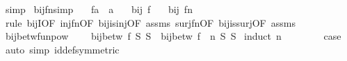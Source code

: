 \begin{isabellebody}
\isamarkupfalse%
\ simp%
\endisatagproof
{\isafoldproof}%
%
\isadelimproof
\isanewline
%
\endisadelimproof
\isanewline
{}\isamarkupfalse%
\ bij{\isacharunderscore}{\kern0pt}fn{\isacharbrackleft}{\kern0pt}simp{\isacharbrackright}{\kern0pt}{\isacharcolon}{\kern0pt}\isanewline
\ \ \ f{\isacharcolon}{\kern0pt}{\isacharcolon}{\kern0pt}{\isachardoublequoteopen}{\isacharprime}{\kern0pt}a\ {\isasymRightarrow}\ {\isacharprime}{\kern0pt}a{\isachardoublequoteclose}\isanewline
\ \ \ {\isachardoublequoteopen}bij\ f{\isachardoublequoteclose}\isanewline
\ \ \ {\isachardoublequoteopen}bij\ {\isacharparenleft}{\kern0pt}f{\isacharcircum}{\kern0pt}{\isacharcircum}{\kern0pt}n{\isacharparenright}{\kern0pt}{\isachardoublequoteclose}\isanewline
%
\isadelimproof
%
\endisadelimproof
%
\isatagproof
{}\isamarkupfalse%
\ {\isacharparenleft}{\kern0pt}rule\ bijI{\isacharbrackleft}{\kern0pt}OF\ inj{\isacharunderscore}{\kern0pt}fn{\isacharbrackleft}{\kern0pt}OF\ bij{\isacharunderscore}{\kern0pt}is{\isacharunderscore}{\kern0pt}inj{\isacharbrackleft}{\kern0pt}OF\ assms{\isacharbrackright}{\kern0pt}{\isacharbrackright}{\kern0pt}\ surj{\isacharunderscore}{\kern0pt}fn{\isacharbrackleft}{\kern0pt}OF\ bij{\isacharunderscore}{\kern0pt}is{\isacharunderscore}{\kern0pt}surj{\isacharbrackleft}{\kern0pt}OF\ assms{\isacharbrackright}{\kern0pt}{\isacharbrackright}{\kern0pt}{\isacharbrackright}{\kern0pt}{\isacharparenright}{\kern0pt}%
\endisatagproof
{\isafoldproof}%
%
\isadelimproof
\isanewline
%
\endisadelimproof
\isanewline
{}\isamarkupfalse%
\ bij{\isacharunderscore}{\kern0pt}betw{\isacharunderscore}{\kern0pt}funpow{\isacharcolon}{\kern0pt}\ \isanewline
\ \ \ {\isachardoublequoteopen}bij{\isacharunderscore}{\kern0pt}betw\ f\ S\ S{\isachardoublequoteclose}\ \ {\isachardoublequoteopen}bij{\isacharunderscore}{\kern0pt}betw\ {\isacharparenleft}{\kern0pt}f\ {\isacharcircum}{\kern0pt}{\isacharcircum}{\kern0pt}\ n{\isacharparenright}{\kern0pt}\ S\ S{\isachardoublequoteclose}\isanewline
%
\isadelimproof
%
\endisadelimproof
%
\isatagproof
{}\isamarkupfalse%
\ {\isacharparenleft}{\kern0pt}induct\ n{\isacharparenright}{\kern0pt}\isanewline
\ \ \isamarkupfalse%
\ {}\ \isamarkupfalse%
\ \isamarkupfalse%
\ {\isacharquery}{\kern0pt}case\ \isamarkupfalse%
\ {\isacharparenleft}{\kern0pt}auto\ simp{\isacharcolon}{\kern0pt}\ id{\isacharunderscore}{\kern0pt}def{\isacharbrackleft}{\kern0pt}symmetric{\isacharbrackright}{\kern0pt}{\isacharparenright}{\kern0pt}\isanewline

\end{isabellebody}
